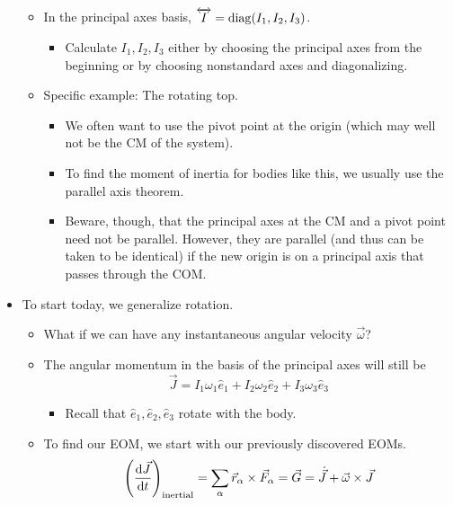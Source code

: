 \documentclass[../notes.tex]{subfiles}
\begin{document}
\begin{itemize}
\begin{itemize}
\begin{itemize}
        \end{itemize}
        \item In the principal axes basis, $\overleftrightarrow{I}=\operatorname{diag}(I_1,I_2,I_3)$.
        \begin{itemize}
            \item Calculate $I_1,I_2,I_3$ either by choosing the principal axes from the beginning or by choosing nonstandard axes and diagonalizing.
        \end{itemize}
        \item Specific example: The rotating top.
        \begin{itemize}
            \item We often want to use the pivot point at the origin (which may well not be the CM of the system).
            \item To find the moment of inertia for bodies like this, we usually use the parallel axis theorem.
            \item Beware, though, that the principal axes at the CM and a pivot point need not be parallel. However, they are parallel (and thus can be taken to be identical) if the new origin is on a principal axis that passes through the COM.
        \end{itemize}
    \end{itemize}
    \item To start today, we generalize rotation.
    \begin{itemize}
        \item What if we can have any instantaneous angular velocity $\vec{\omega}$?
        \item The angular momentum in the basis of the principal axes will still be
        \begin{equation*}
            \vec{J} = I_1\omega_1\hat{e}_1+I_2\omega_2\hat{e}_2+I_3\omega_3\hat{e}_3
        \end{equation*}
        \begin{itemize}
            \item Recall that $\hat{e}_1,\hat{e}_2,\hat{e}_3$ rotate with the body.
        \end{itemize}
        \item To find our EOM, we start with our previously discovered EOMs.
        \begin{equation*}
            \left( \dv{\vec{J}}{t} \right)_\text{inertial} = \sum_\alpha\vec{r}_\alpha\times\vec{F}_\alpha
            = \vec{G}
            = \dot{\vec{J}}+\vec{\omega}\times\vec{J}

\end{equation*}
\end{itemize}
\end{itemize}
\end{document}
